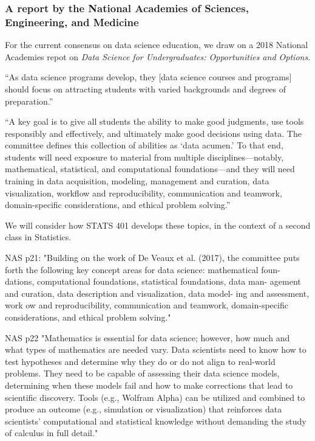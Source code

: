 \documentclass{beamer}
\begin{document}
\begin{frame}
\frametitle{A report by the National Academies of Sciences, Engineering, and Medicine}


\begin{myitemize}
\item For the current consensus on data science education, we draw on a 2018 National Academies repot on {\em  Data Science for Undergraduates: Opportunities and Options}.
  
\item ``As data science programs develop, they [data science courses and programs] should focus on attracting students with varied backgrounds and degrees of preparation.''

\item ``A key goal is to give all students the ability to make good judgments, use tools responsibly and effectively, and ultimately make good decisions using data. The committee defines this collection of abilities as `data acumen.' To that end, students will need exposure to material from multiple disciplines---notably, mathematical, statistical, and computational foundations---and they will need training in data acquisition, modeling, management and curation, data visualization, workflow and reproducibility, communication and teamwork, domain-specific considerations, and ethical problem solving.''

\item We will consider how STATS 401 develops these topics, in the context of a second class in Statistics.

\end{myitemize}
\end{frame}

NAS p21:
"Building on the work of De Veaux et al. (2017), the committee puts forth the following key concept areas for data science: mathematical foun- dations, computational foundations, statistical foundations, data man- agement and curation, data description and visualization, data model- ing and assessment, work ow and reproducibility, communication and teamwork, domain-specific considerations, and ethical problem solving."

NAS p22
"Mathematics is essential for data science; however, how much and what types of mathematics are needed vary. Data scientists need to know how to test hypotheses and determine why they do or do not align to real-world problems. They need to be capable of assessing their data science models, determining when these models fail and how to make corrections that lead to scientific discovery. Tools (e.g., Wolfram Alpha) can be utilized and combined to produce an outcome (e.g., simulation or visualization) that reinforces data scientists’ computational and statistical knowledge without demanding the study of calculus in full detail."
\end{document}
